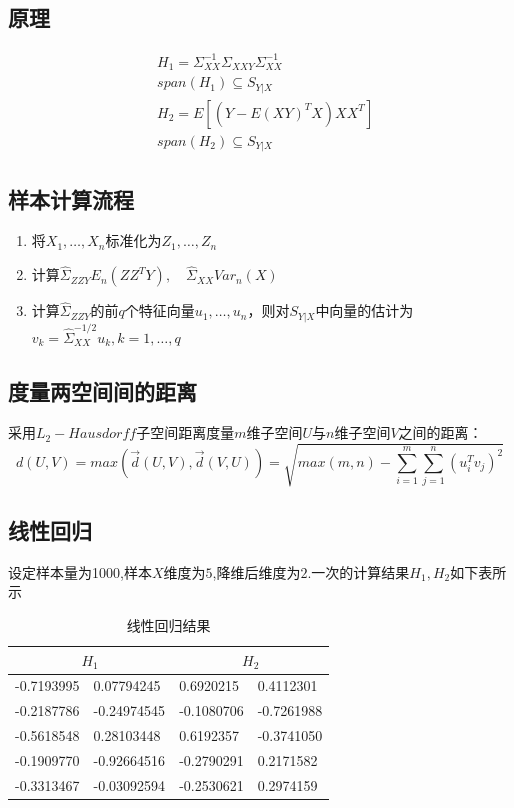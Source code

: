 \subsection{原理}
\begin{align*}
    &H_1 = \Sigma_{XX}^{-1} \Sigma_{XXY} \Sigma_{XX}^{-1} \\
    &span(H_1) \subseteq S_{Y|X} \\
    &H_2 = E[(Y-E(XY)^TX)XX^T] \\
    &span(H_2) \subseteq S_{Y|X}
\end{align*}
\subsection{样本计算流程}
\begin{enumerate}
    \item 将$X_1,\dots,X_n$标准化为$Z_1,\dots,Z_n$
    \item 计算$\hat{\Sigma}_{ZZY}E_n(ZZ^TY),\quad \hat{\Sigma}_{XX}Var_n(X)$
    \item 计算$\hat{\Sigma}_{ZZY}$的前$q$个特征向量$u_1,\dots,u_n$，则对$S_{Y|X}$中向量的估计为$v_k=\hat{\Sigma}_{XX}^{-1/2}u_k,k=1,\dots,q$
\end{enumerate}

\subsection{度量两空间间的距离}
采用$L_2-Hausdorff$子空间距离度量$m$维子空间$U$与$n$维子空间$V$之间的距离：
$$d(U,V)=max(\vec{d}(U,V),\vec{d}(V,U))=\sqrt{max(m,n)-\sum_{i=1}^m\sum_{j=1}^n(u_i^Tv_j)^2}$$

\subsection{线性回归}
设定样本量为1000,样本$X$维度为$5$,降维后维度为$2$.一次的计算结果$H_1,H_2$如下表所示

\begin{table}[htbp]
\centering
\caption{线性回归结果}
\label{tab:norm}
\begin{tabular}{l|l|ll}
\hline
\multicolumn{2}{c|}{$H_1$} & \multicolumn{2}{c}{$H_2$}                    \\ \hline
-0.7193995  & 0.07794245   & \multicolumn{1}{l|}{0.6920215}  & 0.4112301  \\ \hline
-0.2187786  & -0.24974545  & \multicolumn{1}{l|}{-0.1080706} & -0.7261988 \\ \hline
-0.5618548  & 0.28103448   & \multicolumn{1}{l|}{0.6192357}  & -0.3741050 \\ \hline
-0.1909770  & -0.92664516  & \multicolumn{1}{l|}{-0.2790291} & 0.2171582  \\ \hline
-0.3313467  & -0.03092594  & \multicolumn{1}{l|}{-0.2530621} & 0.2974159  \\ \hline
\end{tabular}
\end{table}

